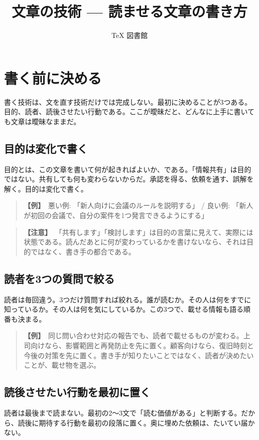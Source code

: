 \documentclass{article}
\title{文章の技術 — 読ませる文章の書き方}
\author{TeX 図書館}
\begin{document}
\section{書く前に決める}

書く技術は、文を直す技術だけでは完成しない。最初に決めることが3つある。目的、読者、読後させたい行動である。ここが曖昧だと、どんなに上手に書いても文章は曖昧なままだ。

\subsection{目的は変化で書く}

目的とは、この文章を書いて何が起きればよいか、である。「情報共有」は目的ではない。共有しても何も変わらないからだ。承認を得る、依頼を通す、誤解を解く。目的は変化で書く。

\begin{quote}
\textbf{【例】}\ 悪い例: 「新人向けに会議のルールを説明する」 / 良い例: 「新人が初回の会議で、自分の案件を1つ発言できるようにする」
\end{quote}

\begin{quote}
\textbf{【注意】}\ 「共有します」「検討します」は目的の言葉に見えて、実際には状態である。読んだあとに何が変わっているかを書けないなら、それは目的ではなく、書き手の都合である。
\end{quote}

\subsection{読者を3つの質問で絞る}

読者は毎回違う。3つだけ質問すれば絞れる。誰が読むか。その人は何をすでに知っているか。その人は何を気にしているか。この3つで、載せる情報も語る順番も決まる。

\begin{quote}
\textbf{【例】}\ 同じ問い合わせ対応の報告でも、読者で載せるものが変わる。上司向けなら、影響範囲と再発防止を先に置く。顧客向けなら、復旧時刻と今後の対策を先に置く。書き手が知りたいことではなく、読者が決めたいことが、載せ物を選ぶ。
\end{quote}

\subsection{読後させたい行動を最初に置く}

読者は最後まで読まない。最初の2〜3文で「読む価値がある」と判断する。だから、読後に期待する行動を最初の段落に置く。奥に埋めた依頼は、たいてい届かない。
\end{document}
